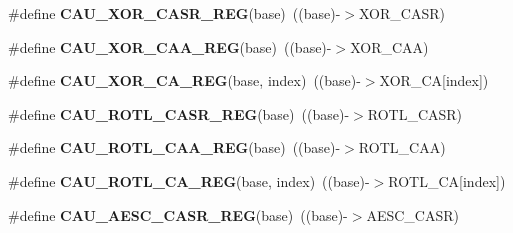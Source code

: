 \begin{DoxyCompactItemize}
\item 
\#define {\bfseries C\+A\+U\+\_\+\+X\+O\+R\+\_\+\+C\+A\+S\+R\+\_\+\+R\+EG}(base)~((base)-\/$>$X\+O\+R\+\_\+\+C\+A\+SR)\hypertarget{group__CAU__Register__Accessor__Macros_ga393de2803db60a1f80d2600fc1ae7721}{}\label{group__CAU__Register__Accessor__Macros_ga393de2803db60a1f80d2600fc1ae7721}

\item 
\#define {\bfseries C\+A\+U\+\_\+\+X\+O\+R\+\_\+\+C\+A\+A\+\_\+\+R\+EG}(base)~((base)-\/$>$X\+O\+R\+\_\+\+C\+AA)\hypertarget{group__CAU__Register__Accessor__Macros_ga095847819b81c22bcc6b7097f97a5a54}{}\label{group__CAU__Register__Accessor__Macros_ga095847819b81c22bcc6b7097f97a5a54}

\item 
\#define {\bfseries C\+A\+U\+\_\+\+X\+O\+R\+\_\+\+C\+A\+\_\+\+R\+EG}(base,  index)~((base)-\/$>$X\+O\+R\+\_\+\+CA\mbox{[}index\mbox{]})\hypertarget{group__CAU__Register__Accessor__Macros_ga3c7dbe782cb08cb8afa8f998f9d92a11}{}\label{group__CAU__Register__Accessor__Macros_ga3c7dbe782cb08cb8afa8f998f9d92a11}

\item 
\#define {\bfseries C\+A\+U\+\_\+\+R\+O\+T\+L\+\_\+\+C\+A\+S\+R\+\_\+\+R\+EG}(base)~((base)-\/$>$R\+O\+T\+L\+\_\+\+C\+A\+SR)\hypertarget{group__CAU__Register__Accessor__Macros_gabd3703b09269d6a70e8c7b7fc25fe69e}{}\label{group__CAU__Register__Accessor__Macros_gabd3703b09269d6a70e8c7b7fc25fe69e}

\item 
\#define {\bfseries C\+A\+U\+\_\+\+R\+O\+T\+L\+\_\+\+C\+A\+A\+\_\+\+R\+EG}(base)~((base)-\/$>$R\+O\+T\+L\+\_\+\+C\+AA)\hypertarget{group__CAU__Register__Accessor__Macros_ga5f94ba9f977dc0b92e95789a35ac1fc7}{}\label{group__CAU__Register__Accessor__Macros_ga5f94ba9f977dc0b92e95789a35ac1fc7}

\item 
\#define {\bfseries C\+A\+U\+\_\+\+R\+O\+T\+L\+\_\+\+C\+A\+\_\+\+R\+EG}(base,  index)~((base)-\/$>$R\+O\+T\+L\+\_\+\+CA\mbox{[}index\mbox{]})\hypertarget{group__CAU__Register__Accessor__Macros_ga9b63a829f991a7d919f262b0a2850215}{}\label{group__CAU__Register__Accessor__Macros_ga9b63a829f991a7d919f262b0a2850215}

\item 
\#define {\bfseries C\+A\+U\+\_\+\+A\+E\+S\+C\+\_\+\+C\+A\+S\+R\+\_\+\+R\+EG}(base)~((base)-\/$>$A\+E\+S\+C\+\_\+\+C\+A\+SR)\hypertarget{group__CAU__Register__Accessor__Macros_ga425b3f0d5d24cc45dcc3761b0c5056d9}{}\label{group__CAU__Register__Accessor__Macros_ga425b3f0d5d24cc45dcc3761b0c5056d9}


\end{DoxyCompactItemize}
